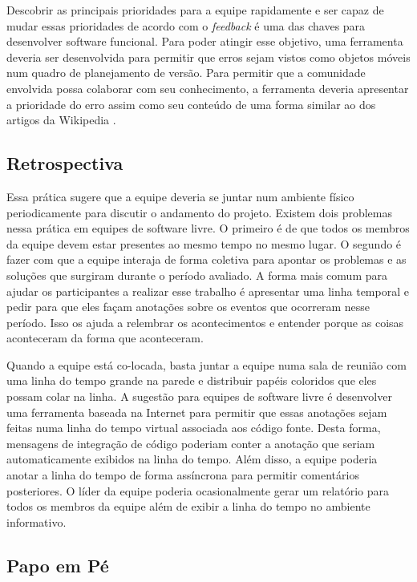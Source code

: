 Descobrir as principais prioridades para a equipe rapidamente e ser
capaz de mudar essas prioridades de acordo com o \emph{feedback} é uma
das chaves para desenvolver software funcional. Para poder atingir
esse objetivo, uma ferramenta deveria ser desenvolvida para permitir
que erros sejam vistos como objetos móveis num quadro de planejamento
de versão. Para permitir que a comunidade envolvida possa colaborar
com seu conhecimento, a ferramenta deveria apresentar a prioridade do
erro assim como seu conteúdo de uma forma similar ao dos artigos da
Wikipedia \cite{Surowiecki2004,Tapscott2006,Benkler2006}.

\subsection{Retrospectiva}
\label{subsec:retrospect}

Essa prática sugere que a equipe deveria se juntar num ambiente físico
periodicamente para discutir o andamento do projeto. Existem dois
problemas nessa prática em equipes de software livre. O primeiro é de
que todos os membros da equipe devem estar presentes ao mesmo tempo no
mesmo lugar. O segundo é fazer com que a equipe interaja de forma
coletiva para apontar os problemas e as soluções que surgiram durante
o período avaliado. A forma mais comum para ajudar os participantes a
realizar esse trabalho é apresentar uma linha temporal e pedir para
que eles façam anotações sobre os eventos que ocorreram nesse
período. Isso os ajuda a relembrar os acontecimentos e entender porque
as coisas aconteceram da forma que aconteceram.

Quando a equipe está co-locada, basta juntar a equipe numa sala de
reunião com uma linha do tempo grande na parede e distribuir papéis
coloridos que eles possam colar na linha. A sugestão para equipes de
software livre é desenvolver uma ferramenta baseada na Internet para
permitir que essas anotações sejam feitas numa linha do tempo virtual
associada aos código fonte. Desta forma, mensagens de integração de
código poderiam conter a anotação que seriam automaticamente exibidos
na linha do tempo. Além disso, a equipe poderia anotar a linha do
tempo de forma assíncrona para permitir comentários posteriores. O
líder da equipe poderia ocasionalmente gerar um relatório para todos
os membros da equipe além de exibir a linha do tempo no ambiente
informativo.

\subsection{Papo em Pé}
\label{subsec:stand-up}

